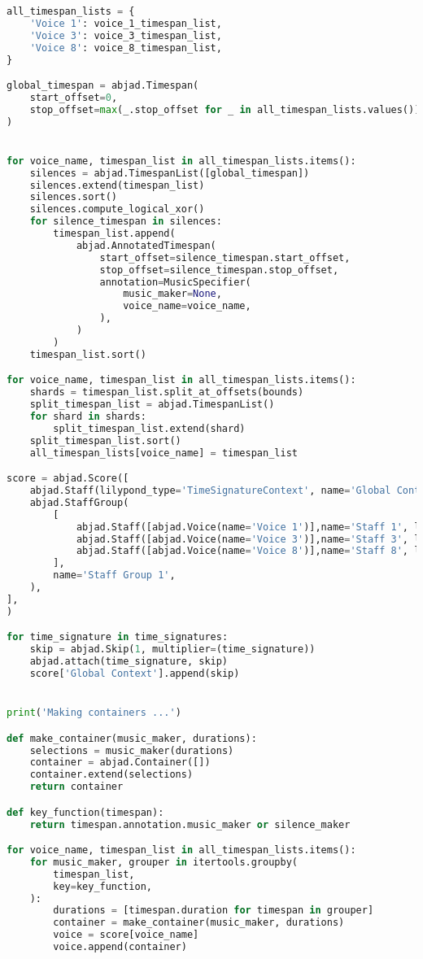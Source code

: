 \begin{lstlisting}[language=Python, caption=Four Ages of Sand Segment\_I]
all_timespan_lists = {
    'Voice 1': voice_1_timespan_list,
    'Voice 3': voice_3_timespan_list,
    'Voice 8': voice_8_timespan_list,
}

global_timespan = abjad.Timespan(
    start_offset=0,
    stop_offset=max(_.stop_offset for _ in all_timespan_lists.values())
)


for voice_name, timespan_list in all_timespan_lists.items():
    silences = abjad.TimespanList([global_timespan])
    silences.extend(timespan_list)
    silences.sort()
    silences.compute_logical_xor()
    for silence_timespan in silences:
        timespan_list.append(
            abjad.AnnotatedTimespan(
                start_offset=silence_timespan.start_offset,
                stop_offset=silence_timespan.stop_offset,
                annotation=MusicSpecifier(
                    music_maker=None,
                    voice_name=voice_name,
                ),
            )
        )
    timespan_list.sort()

for voice_name, timespan_list in all_timespan_lists.items():
    shards = timespan_list.split_at_offsets(bounds)
    split_timespan_list = abjad.TimespanList()
    for shard in shards:
        split_timespan_list.extend(shard)
    split_timespan_list.sort()
    all_timespan_lists[voice_name] = timespan_list

score = abjad.Score([
    abjad.Staff(lilypond_type='TimeSignatureContext', name='Global Context'),
    abjad.StaffGroup(
        [
            abjad.Staff([abjad.Voice(name='Voice 1')],name='Staff 1', lilypond_type='Staff',),
            abjad.Staff([abjad.Voice(name='Voice 3')],name='Staff 3', lilypond_type='Staff',),
            abjad.Staff([abjad.Voice(name='Voice 8')],name='Staff 8', lilypond_type='Staff',),
        ],
        name='Staff Group 1',
    ),
],
)

for time_signature in time_signatures:
    skip = abjad.Skip(1, multiplier=(time_signature))
    abjad.attach(time_signature, skip)
    score['Global Context'].append(skip)


print('Making containers ...')

def make_container(music_maker, durations):
    selections = music_maker(durations)
    container = abjad.Container([])
    container.extend(selections)
    return container

def key_function(timespan):
    return timespan.annotation.music_maker or silence_maker

for voice_name, timespan_list in all_timespan_lists.items():
    for music_maker, grouper in itertools.groupby(
        timespan_list,
        key=key_function,
    ):
        durations = [timespan.duration for timespan in grouper]
        container = make_container(music_maker, durations)
        voice = score[voice_name]
        voice.append(container)


\end{lstlisting}
